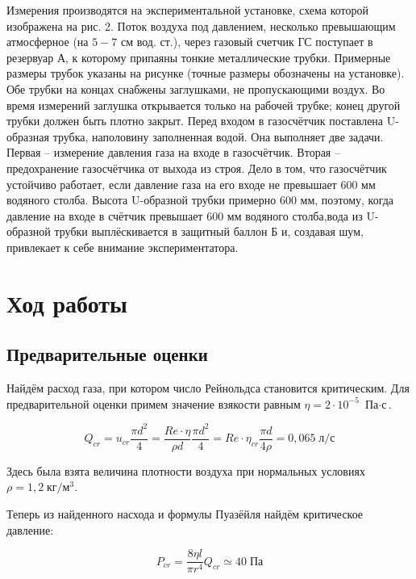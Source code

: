 \documentclass[a4paper, 12pt]{article} %
\begin{document}
Измерения производятся на экспериментальной установке, схема которой изображена на рис. 2. Поток воздуха под давлением, несколько превышающим атмосферное (на $5-7$ см вод. ст.), через газовый счетчик ГС поступает в резервуар А, к которому припаяны тонкие металлические трубки. Примерные размеры трубок указаны на рисунке (точные размеры обозначены на установке). Обе трубки на концах снабжены заглушками, не пропускающими воздух. Во время измерений заглушка открывается только на рабочей трубке; конец другой трубки должен быть плотно закрыт. Перед входом в газосчётчик поставлена U-образная трубка, наполовину заполненная водой. Она выполняет две задачи. Первая -- измерение давления газа на входе в газосчётчик. Вторая -- предохранение газосчётчика от выхода из строя. Дело в том, что газосчётчик устойчиво работает, если давление газа на его входе не превышает $600$ мм водяного столба. Высота U-образной трубки примерно $600$ мм, поэтому, когда давление на входе в счётчик превышает $600$ мм водяного столба,вода из U-образной трубки выплёскивается в защитный баллон Б и, создавая шум, привлекает к себе внимание экспериментатора.
 
\section{Ход работы}

\subsection{Предварительные оценки}

Найдём расход газа, при котором число Рейнольдса становится критическим. Для предварительной оценки примем значение взякости равным $\eta = 2 \cdot 10^{-5}$ $\text{Па} \cdot \text{с}$.

\begin{equation}
	Q_{cr} = u_{cr} \frac{\pi d^2}{4} = \frac{Re \cdot \eta}{\rho d} \frac{\pi d^2}{4} = Re \cdot \eta_{cr} \frac{\pi d}{4 \rho } = 0,065 \; \text{л/с}
\end{equation}

Здесь была взята величина плотности воздуха при нормальных условиях $\rho = 1,2 \; \text{кг}/\text{м}^3$.

Теперь из найденного насхода и формулы Пуазёйля найдём критическое давление:

\begin{equation}
	P_{cr} = \frac{8 \eta l}{\pi r^4} Q_{cr} \simeq 40 \; \text{Па}
\end{equation}
\end{document}
